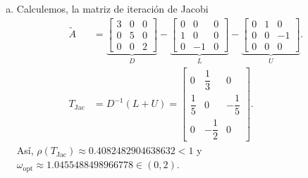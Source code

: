 \begin{frame}
	\begin{solution}
		\begin{enumerate}[b)]
			\item

			      Calculemos, la matriz de iteración de Jacobi
			      \begin{align*}
				      \widetilde{A}  & =
				      \underbrace{ \begin{bmatrix}
						                   3 & 0 & 0 \\
						                   0 & 5 & 0 \\
						                   0 & 0 & 2
					                   \end{bmatrix}}_{\displaystyle D}
				      -
				      \underbrace{\begin{bmatrix}
						                  0 & 0  & 0 \\
						                  1 & 0  & 0 \\
						                  0 & -1 & 0
					                  \end{bmatrix}}_{\displaystyle L}
				      -
				      \underbrace{\begin{bmatrix}
						                  0 & 1 & 0  \\
						                  0 & 0 & -1 \\
						                  0 & 0 & 0
					                  \end{bmatrix}}_{\displaystyle U}. \\
				      T_{\text{Jac}} & =D^{-1}\left(L+U\right)=
				      \begin{bmatrix}
					      0            & \dfrac{1}{3}  & 0             \\
					      \dfrac{1}{5} & 0             & -\dfrac{1}{5} \\
					      0            & -\dfrac{1}{2} & 0
				      \end{bmatrix}.
			      \end{align*}
			      Así,
			      \begin{math}
				      \rho\left(T_{\text{Jac}}\right)\approx
				      0.4082482904638632<1
			      \end{math}
			      y
			      \begin{math}
				      \omega_{\text{opt}}\approx
				      1.0455488498966778\in\left(0,2\right)
			      \end{math}.


\end{enumerate}
\end{solution}
\end{frame}
